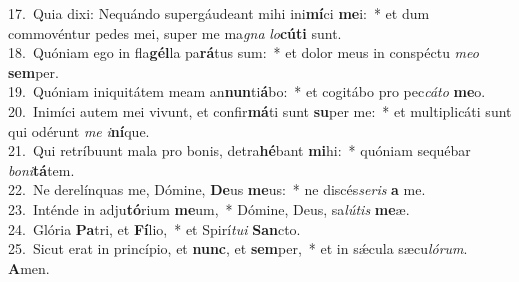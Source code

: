 {17.~}Quia dixi: Nequándo supergáudeant mihi ini\textbf{mí}ci \textbf{me}i:~* et dum commovéntur pedes mei, super me ma\textit{gna} \textit{lo}\textbf{cú}\textbf{ti} sunt.\\
{18.~}Quóniam ego in fla\textbf{gél}la pa\textbf{rá}tus sum:~* et dolor meus in conspéctu \textit{me}\textit{o} \textbf{sem}per.\\
{19.~}Quóniam iniquitátem meam an\textbf{nun}ti\textbf{á}bo:~* et cogitábo pro pec\textit{cá}\textit{to} \textbf{me}o.\\
{20.~}Inimíci autem mei vivunt, et confir\textbf{má}ti sunt \textbf{su}per me:~* et multiplicáti sunt qui odérunt \textit{me} \textit{i}\textbf{ní}que.\\
{21.~}Qui retríbuunt mala pro bonis, detra\textbf{hé}bant \textbf{mi}hi:~* quóniam sequébar \textit{bo}\textit{ni}\textbf{tá}tem.\\
{22.~}Ne derelínquas me, Dómine, \textbf{De}us \textbf{me}us:~* ne discés\textit{se}\textit{ris} \textbf{a} me.\\
{23.~}Inténde in adju\textbf{tó}rium \textbf{me}um,~* Dómine, Deus, sa\textit{lú}\textit{tis} \textbf{me}æ.\\
{24.~}Glória \textbf{Pa}tri, et \textbf{Fí}lio,~* et Spirí\textit{tu}\textit{i} \textbf{San}cto.\\
{25.~}Sicut erat in princípio, et \textbf{nunc}, et \textbf{sem}per,~* et in sǽcula sæcu\textit{ló}\textit{rum}. \textbf{A}men.\\

